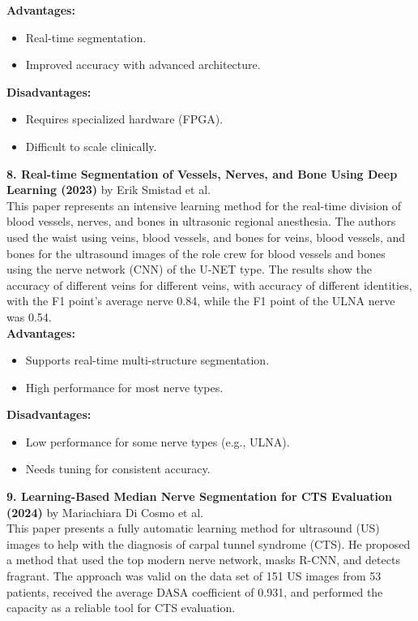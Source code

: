 \documentclass[12pt]{article}
\begin{document}
\textbf{Advantages:}
\begin{itemize}
    \item Real-time segmentation.
    \item Improved accuracy with advanced architecture.
\end{itemize}

\textbf{Disadvantages:}
\begin{itemize}
    \item Requires specialized hardware (FPGA).
    \item Difficult to scale clinically.
\end{itemize}

\vspace{10pt}

\noindent \textbf{8. Real-time Segmentation of Vessels, Nerves, and Bone Using Deep Learning (2023)} by Erik Smistad et al.\\
This paper represents an intensive learning method for the real-time division of blood vessels, nerves, and bones in ultrasonic regional
anesthesia. The authors used the waist using veins, blood vessels, and bones for veins, blood vessels, and bones for the ultrasound images of the role crew for blood vessels and bones using the
nerve network (CNN) of the U-NET type. The results show the accuracy of different veins for
different veins, with accuracy of different identities, with the F1 point’s average nerve 0.84, while
the F1 point of the ULNA nerve was 0.54.\\

\textbf{Advantages:}
\begin{itemize}
    \item Supports real-time multi-structure segmentation.
    \item High performance for most nerve types.
\end{itemize}

\textbf{Disadvantages:}
\begin{itemize}
    \item Low performance for some nerve types (e.g., ULNA).
    \item Needs tuning for consistent accuracy.
\end{itemize}

\vspace{10pt}
\newpage
\noindent \textbf{9. Learning-Based Median Nerve Segmentation for CTS Evaluation (2024)} by Mariachiara Di Cosmo et al.\\
This paper presents a fully automatic
learning method for ultrasound (US) images to help with the diagnosis of carpal tunnel syndrome
(CTS). He proposed a method that used the top modern nerve network, masks R-CNN, and detects
fragrant. The approach was valid on the data set of 151 US images from 53 patients, received
the average DASA coefficient of 0.931, and performed the capacity as a reliable tool for CTS
evaluation.\\
\end{document}
